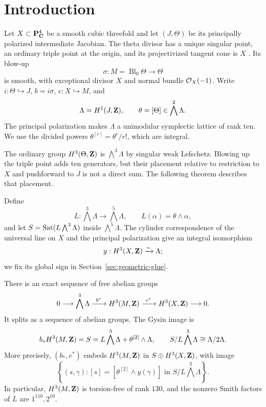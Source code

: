 \section{Introduction}\label{sec:introduction}

Let \(X\subset\mathbf P^4_{\mathbf C}\) be a smooth cubic threefold and let
\((J,\Theta)\) be its principally polarized intermediate Jacobian.  The
theta divisor has a unique singular point, an ordinary triple point at the
origin, and its projectivized tangent cone is \(X\)
\cite[Theorem~1]{BeauvilleTheta}.  Its blow-up
\[
 \sigma:M=\operatorname{Bl}_0\Theta\longrightarrow\Theta
\]
is smooth, with exceptional divisor \(X\) and normal bundle
\(\mathcal O_X(-1)\).  Write \(i:\Theta\hookrightarrow J\), \(b=i\sigma\),
\(e:X\hookrightarrow M\), and
\[
 \Lambda=H^1(J,\mathbf Z),\qquad
 \theta=[\Theta]\in\bigwedge^2\Lambda.
\]
The principal polarization makes \(\Lambda\) a unimodular symplectic lattice
of rank ten.  We use the divided powers
\(\theta^{[r]}=\theta^r/r!\), which are integral.

The ordinary group \(H^3(\Theta,\mathbf Z)\) is \(\bigwedge^3\Lambda\) by singular
weak Lefschetz.  Blowing up the triple point adds ten generators, but their
placement relative to restriction to \(X\) and pushforward to \(J\) is not a
direct sum.  The following theorem describes that placement.

Define
\[
 L:\bigwedge^3\Lambda\longrightarrow\bigwedge^5\Lambda,
 \qquad L(\alpha)=\theta\wedge\alpha,
\]
and let \(S=\operatorname{Sat}(L\bigwedge^3\Lambda)\) inside
\(\bigwedge^5\Lambda\).  The cylinder correspondence of the universal line
on \(X\) and the principal polarization give an integral isomorphism
\[
 y:H^3(X,\mathbf Z)\xrightarrow{\sim}\Lambda;
\]
we fix its global sign in Section~\ref{sec:geometric-glue}.

\begin{theorem}\label{thm:main-lattice}
There is an exact sequence of free abelian groups
\begin{equation}\label{eq:main-exact}
 0\longrightarrow\bigwedge^3\Lambda
 \xrightarrow{\ b^*\ }H^3(M,\mathbf Z)
 \xrightarrow{\ e^*\ }H^3(X,\mathbf Z)\longrightarrow0.
\end{equation}
It splits as a sequence of abelian groups.  The Gysin image is
\begin{equation}\label{eq:main-saturation}
 b_*H^3(M,\mathbf Z)=S
 =L\bigwedge^3\Lambda+\theta^{[2]}\wedge\Lambda,
 \qquad S/L\bigwedge^3\Lambda\cong\Lambda/2\Lambda.
\end{equation}
More precisely, \((b_*,e^*)\) embeds \(H^3(M,\mathbf Z)\) in
\(S\oplus H^3(X,\mathbf Z)\), with image
\begin{equation}\label{eq:main-fibre-product}
 \left\{(s,\gamma):
 [s]=[\theta^{[2]}\wedge y(\gamma)]
 \text{ in }S/L\bigwedge^3\Lambda\right\}.
\end{equation}
In particular, \(H^3(M,\mathbf Z)\) is torsion-free of rank \(130\), and the
nonzero Smith factors of \(L\) are \(1^{110},2^{10}\).
\end{theorem}

